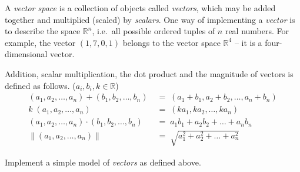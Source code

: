 

\problem A \textit{vector space} is a collection of objects called \textit{vectors}, which may be added together and
multiplied (scaled) by \textit{scalars}. One way of implementing a \textit{vector} is to describe the space $\mathbb{R}^n$,
i.e.\ all possible ordered tuples of $n$ real numbers. For example, the vector $(1, 7, 0, 1)$ belongs to the vector space
$\mathbb{R}^4$ -- it is a four-dimensional vector.

Addition, scalar multiplication, the dot product and the magnitude of vectors is defined as follows. ($a_i, b_i, k \in \mathbb{R}$)
\begin{align*}
	(a_1, a_2, \dots, a_n) + (b_1, b_2, \dots, b_n) \;&=\; (a_1+b_1, a_2+b_2, \dots, a_n + b_n)  \tag{Addition} \\
	k \;(a_1, a_2, \dots, a_n) \;&=\; (ka_1, ka_2, \dots, ka_n)		\tag{Scalar Multiplication} \\
	(a_1, a_2, \dots, a_n) \cdot (b_1, b_2, \dots, b_n) \;&=\; a_1b_1 + a_2b_2 + \dots + a_nb_n  \tag{Dot Product} \\
	\left\| (a_1, a_2, \dots, a_n) \right\| \;&=\; \sqrt{a_1^2 + a_2^2 + \dots + a_n^2}	\tag{Magnitude}
\end{align*}

Implement a simple model of \textit{vectors} as defined above. 

